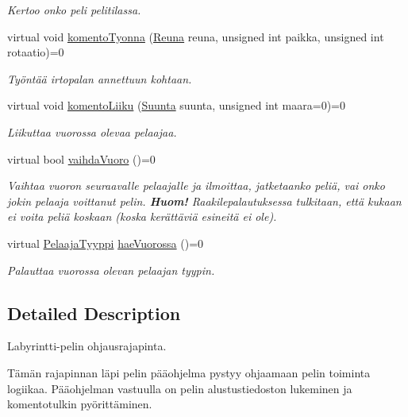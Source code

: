 \begin{DoxyCompactItemize}
\begin{DoxyCompactList}\small\item\em Kertoo onko peli pelitilassa. \end{DoxyCompactList}\item 
virtual void \hyperlink{class_julkinen_1_1_pelirajapinta_aea8cbb43bcf85664b97d17df1666ce9f}{komento\+Tyonna} (\hyperlink{namespace_julkinen_acce0eefc4c90f907dd5fb319b0d05872}{Reuna} reuna, unsigned int paikka, unsigned int rotaatio)=0
\begin{DoxyCompactList}\small\item\em Työntää irtopalan annettuun kohtaan. \end{DoxyCompactList}\item 
virtual void \hyperlink{class_julkinen_1_1_pelirajapinta_a3444c155143baff73521a0707712b36a}{komento\+Liiku} (\hyperlink{namespace_julkinen_a81b50e3c6f21c0c1c46e186592107c3c}{Suunta} suunta, unsigned int maara=0)=0
\begin{DoxyCompactList}\small\item\em Liikuttaa vuorossa olevaa pelaajaa. \end{DoxyCompactList}\item 
virtual bool \hyperlink{class_julkinen_1_1_pelirajapinta_a873b4d57d698b82df131246df85c3193}{vaihda\+Vuoro} ()=0
\begin{DoxyCompactList}\small\item\em Vaihtaa vuoron seuraavalle pelaajalle ja ilmoittaa, jatketaanko peliä, vai onko jokin pelaaja voittanut pelin. {\bfseries Huom!} Raakilepalautuksessa tulkitaan, että kukaan ei voita peliä koskaan (koska kerättäviä esineitä ei ole). \end{DoxyCompactList}\item 
virtual \hyperlink{namespace_julkinen_ad9a0a9e01af78249f584a93b03db4329}{Pelaaja\+Tyyppi} \hyperlink{class_julkinen_1_1_pelirajapinta_aef0e254fd13ac8a44bb9db0908daa0e7}{hae\+Vuorossa} ()=0
\begin{DoxyCompactList}\small\item\em Palauttaa vuorossa olevan pelaajan tyypin. \end{DoxyCompactList}\end{DoxyCompactItemize}


\subsection{Detailed Description}
Labyrintti-\/pelin ohjausrajapinta. 

Tämän rajapinnan läpi pelin pääohjelma pystyy ohjaamaan pelin toiminta logiikaa. Pääohjelman vastuulla on pelin alustustiedoston lukeminen ja komentotulkin pyörittäminen.

